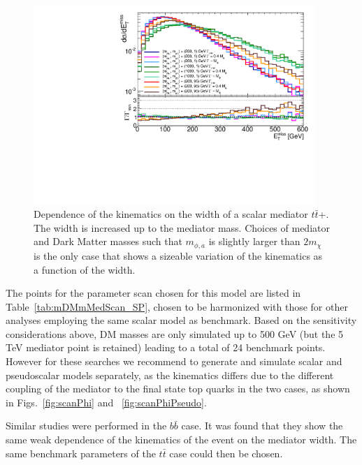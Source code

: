\begin{figure}[!ht]
  \begin{center}
    \includegraphics[width=0.95\textwidth]{figures/ttbar/ScalarWidth.pdf}
    \vspace{2mm}
    \caption{\label{fig:widthlargescan} Dependence of the kinematics on the width of a scalar mediator $t\bar{t}$+\MET{}. The width is increased up to the mediator mass. Choices of mediator and Dark Matter masses such that $m_{\phi,a}$ is slightly larger than $2m_\chi$ is the only case that shows a sizeable variation of the kinematics as a function of the width.  
    }
\end{center}
\end{figure}

The points for the parameter scan chosen for this model are listed in Table~\ref{tab:mDMmMedScan_SP}, chosen
to be harmonized with those for other analyses employing the same scalar model as benchmark. 
Based on the sensitivity considerations above, DM masses are only simulated up to 500 GeV (but the 5 TeV mediator point is retained)
leading to a total of 24 benchmark points. However for these searches we recommend to generate and simulate scalar and pseudoscalar
models separately, as the kinematics differs due to the different coupling of the mediator to the final state top quarks in the two cases,
as shown in Figs.~\ref{fig:scanPhi} and ~\ref{fig:scanPhiPseudo}.

Similar studies were performed in the $b \bar b$ case. It was found that they 
show the same weak dependence of the kinematics of the event on the mediator width.
The same benchmark parameters of the $t\bar t$ case could then be chosen.